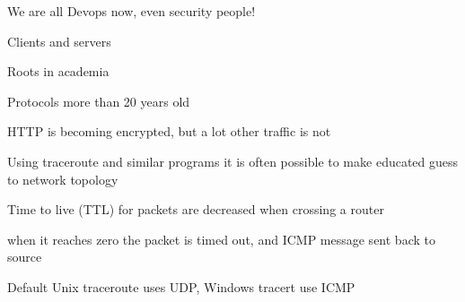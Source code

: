 \documentclass[20pt,landscape,a4paper,footrule]{foils}
\begin{document}
\centerline{We are all Devops now, even security people!}





\begin{list1}
\item Clients and servers
\item Roots in academia
\item Protocols more than 20 years old
\item HTTP is becoming encrypted, but a lot other traffic is not
\end{list1}





\centerline{}




\begin{list1}
\item Using traceroute and similar programs it is often possible to make educated guess to network topology
\item Time to live (TTL) for packets are decreased when crossing a router
\item when it reaches zero the packet is timed out, and ICMP message sent back to source
\item Default Unix traceroute uses UDP, Windows tracert use ICMP
\end{list1}


\end{document}
